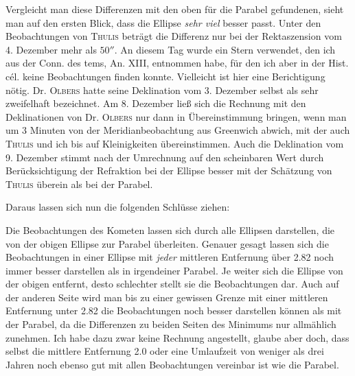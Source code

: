 %
\par\indent Vergleicht man diese Differenzen mit den oben für die Parabel gefundenen, sieht man auf den ersten Blick, dass die Ellipse \emph{sehr viel} besser passt. Unter den Beobachtungen von \textsc{Thulis} beträgt die Differenz nur bei der Rektaszension vom 4. Dezember mehr als $50''$. An diesem Tag wurde ein Stern verwendet, den ich aus der Conn. des tems, An. XIII, entnommen habe, für den ich aber in der Hist. cél. keine Beobachtungen finden konnte. Vielleicht ist hier eine Berichtigung nötig. Dr. \textsc{Olbers} hatte seine Deklination vom 3. Dezember selbst als sehr zweifelhaft bezeichnet. Am 8. Dezember ließ sich die Rechnung mit den Deklinationen von Dr. \textsc{Olbers} nur dann in Übereinstimmung bringen, wenn man um 3 Minuten von der Meridianbeobachtung aus Greenwich abwich, mit der auch \textsc{Thulis} und ich bis auf Kleinigkeiten übereinstimmen. Auch die Deklination vom 9. Dezember stimmt nach der Umrechnung auf den scheinbaren Wert durch Berücksichtigung der Refraktion bei der Ellipse besser mit der Schätzung von \textsc{Thulis} überein als bei der Parabel.

\par\indent Daraus lassen sich nun die folgenden Schlüsse ziehen:

\par\indent Die Beobachtungen des Kometen lassen sich durch alle Ellipsen darstellen, die von der obigen Ellipse zur Parabel überleiten. Genauer gesagt lassen sich die Beobachtungen in einer Ellipse mit \emph{jeder} mittleren Entfernung über 2.82 noch immer besser darstellen als in irgendeiner Parabel. Je weiter sich die Ellipse von der obigen entfernt, desto schlechter stellt sie die Beobachtungen dar. Auch auf der anderen Seite wird man bis zu einer gewissen Grenze mit einer mittleren Entfernung unter 2.82 die Beobachtungen noch besser darstellen können als mit der Parabel, da die Differenzen zu beiden Seiten des Minimums nur allmählich zunehmen. Ich habe dazu zwar keine Rechnung angestellt, glaube aber doch, dass selbst die mittlere Entfernung 2.0 oder eine Umlaufzeit von weniger als drei Jahren noch ebenso gut mit allen Beobachtungen vereinbar ist wie die Parabel.

